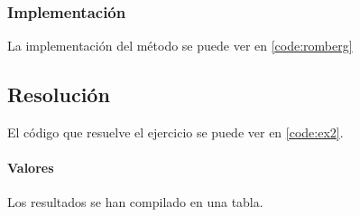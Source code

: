 \subsubsection{Implementación}

La implementación del método se puede ver en \ref{code:romberg}

\subsection{Resolución}


El código que resuelve el ejercicio se puede ver en \ref{code:ex2}. 

\paragraph{Valores} Los resultados se han compilado en una tabla.


\begin{table}[H]
	\centering
\end{table}

